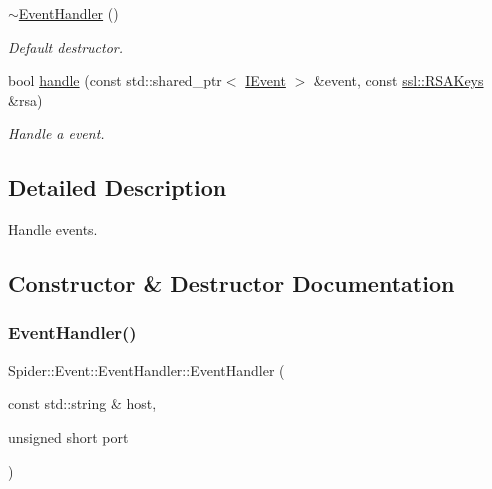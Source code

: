 \begin{DoxyCompactItemize}
\mbox{\label{class_spider_1_1_event_1_1_event_handler_a114b675a93ef37e4f32cd264c210bf27}} 
\hyperlink{class_spider_1_1_event_1_1_event_handler_a114b675a93ef37e4f32cd264c210bf27}{$\sim$\+Event\+Handler} ()
\begin{DoxyCompactList}\small\item\em Default destructor. \end{DoxyCompactList}\item 
bool \hyperlink{class_spider_1_1_event_1_1_event_handler_a09a8b1b3bfce070dc83226db55c7664f}{handle} (const std\+::shared\+\_\+ptr$<$ \hyperlink{class_spider_1_1_event_1_1_i_event}{I\+Event} $>$ \&event, const \hyperlink{class_spider_1_1ssl_1_1_r_s_a_keys}{ssl\+::\+R\+S\+A\+Keys} \&rsa)
\begin{DoxyCompactList}\small\item\em Handle a event. \end{DoxyCompactList}\end{DoxyCompactItemize}


\subsection{Detailed Description}
Handle events. 

\subsection{Constructor \& Destructor Documentation}
\mbox{\label{class_spider_1_1_event_1_1_event_handler_a97d86b6085e4158f8389f2e31dd0c336}} 
\subsubsection{\texorpdfstring{Event\+Handler()}{EventHandler()}}
{\footnotesize\ttfamily Spider\+::\+Event\+::\+Event\+Handler\+::\+Event\+Handler (\begin{DoxyParamCaption}\item[{const std\+::string \&}]{host,  }\item[{unsigned short}]{port }\end{DoxyParamCaption})}



